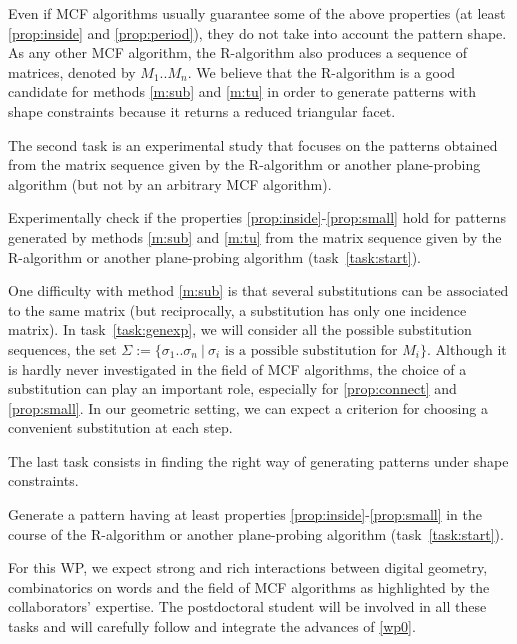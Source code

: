 Even if MCF algorithms usually guarantee some of the above properties
(at least \ref{prop:inside} and \ref{prop:period}), they do not take
into account the pattern shape. As any other MCF algorithm, the R-algorithm
also produces a sequence of matrices, denoted by $M_1..M_n$. We believe that the
R-algorithm is a good candidate for methods \ref{m:sub} and \ref{m:tu} in order
to generate patterns with shape constraints because it returns a reduced triangular facet.

The second task is an experimental study that focuses on the patterns obtained from
the matrix sequence given by the R-algorithm or another plane-probing algorithm (but
not by an arbitrary MCF algorithm).

\begin{Task}
  \label{task:genexp}
  Experimentally check if the properties \ref{prop:inside}-\ref{prop:small}
  hold for patterns generated by methods \ref{m:sub} and \ref{m:tu}
  from the matrix sequence given by the R-algorithm or another plane-probing algorithm
  (task~\ref{task:start}).   
\end{Task}

One difficulty with method \ref{m:sub} is that several substitutions can be associated to the
same matrix (but reciprocally, a substitution has only one incidence matrix).
In task~\ref{task:genexp}, we will consider all the possible substitution sequences, \ie the set
$\Sigma := \{ \sigma_1..\sigma_n \ | \ \sigma_i \text{ is a possible substitution for } M_i \}$.
Although it is hardly never investigated in the field of MCF algorithms, the choice of a
substitution can play an important role, especially for \ref{prop:connect} and \ref{prop:small}.
In our geometric setting, we can expect a criterion for choosing a convenient substitution at each step. 

The last task consists in finding the right way of generating patterns under shape constraints. 

\begin{Task}
  \label{task:genpat}
  Generate a pattern having at least properties \ref{prop:inside}-\ref{prop:small} in the course of
  the R-algorithm or another plane-probing algorithm (task~\ref{task:start}). 
\end{Task}

For this WP, we expect strong and rich interactions between digital geometry, combinatorics on words
and the field of MCF algorithms as highlighted by the collaborators' expertise. The postdoctoral
student will be involved in all these tasks and will carefully follow and integrate the advances
of \ref{wp0}.

